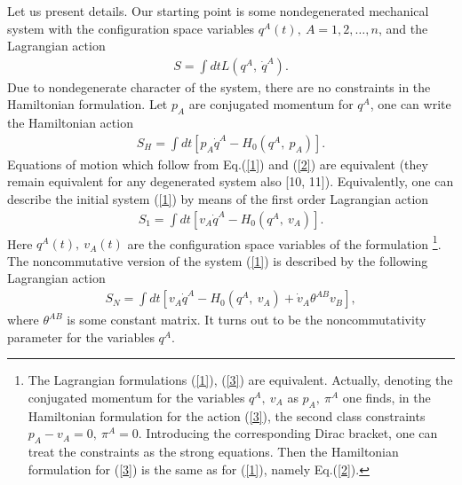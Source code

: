 \documentclass[paper a4]{article}
\begin{document}
Let us present details. Our starting point is some nondegenerated
mechanical system with the configuration space variables $q^A(t), ~
A=1,2, \ldots , n$, and the Lagrangian action
\begin{eqnarray}\label{1}
S=\int dt L(q^A, ~ \dot q^A).
\end{eqnarray}
Due to nondegenerate character of the system, there are no constraints
in the Hamiltonian formulation. Let $p_A$ are conjugated momentum for
$q^A$, one can write the Hamiltonian action
\begin{eqnarray}\label{2}
S_H=\int dt \left[ p_A\dot q^A-H_0(q^A, ~ p_A)\right].
\end{eqnarray}
Equations of motion which follow from Eq.(\ref{1}) and (\ref{2}) are
equivalent (they remain equivalent for any degenerated system also
[10, 11]). Equivalently,
one can describe the initial system (\ref{1}) by means of the first order
Lagrangian action
\begin{eqnarray}\label{3}
S_1=\int dt \left[v_A\dot q^A-H_0(q^A, ~ v_A)\right].
\end{eqnarray}
Here $q^A(t), ~ v_A(t)$ are the configuration space variables of the
formulation \footnote{The Lagrangian formulations (\ref{1}), (\ref{3})
are equivalent. Actually, denoting the conjugated momentum for the
variables $q^A, ~ v_A$ as $p_A, ~ \pi^A$ one finds, in the Hamiltonian
formulation for the action (\ref{3}), the second class constraints
$p_A-v_A=0, ~ \pi^A=0$. Introducing the corresponding Dirac bracket,
one can treat the constraints as the strong equations. Then the
Hamiltonian formulation for (\ref{3}) is the same as for (\ref{1}),
namely Eq.(\ref{2}).}.
The
noncommutative version of the system (\ref{1}) is described by the
following Lagrangian action
\begin{eqnarray}\label{4}
S_N=\int dt \left[v_A\dot q^A-H_0(q^A, ~ v_A)+
\dot v_A\theta^{AB}v_B \right],
\end{eqnarray}
where $\theta^{AB}$ is some constant matrix. It turns out to be the
noncommutativity parameter for the variables $q^A$.
\end{document}

